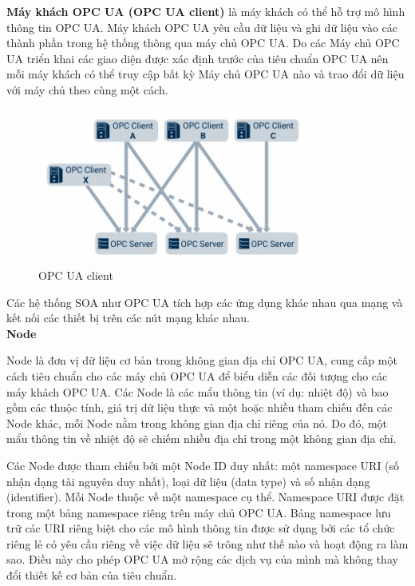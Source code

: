 \textbf{Máy khách OPC UA (OPC UA client)} là máy khách có thể hỗ trợ mô hình thông tin OPC UA. Máy khách OPC UA yêu cầu dữ liệu và ghi dữ liệu vào các thành phần trong hệ thống thông qua máy chủ OPC UA. Do các Máy chủ OPC UA triển khai các giao diện được xác định trước của tiêu chuẩn OPC UA nên mỗi máy khách có thể truy cập bất kỳ Máy chủ OPC UA nào và trao đổi dữ liệu với máy chủ theo cùng một cách.

\begin{figure}[!h]
    \centering
    \includegraphics[width=0.8\textwidth]{Images/Basis_knowledge/OPC_client.jpg}
    \caption{OPC UA client \cite{opcrw}}
    \label{fig:comp_mqtt}
\end{figure}

Các hệ thống SOA như OPC UA tích hợp các ứng dụng khác nhau qua mạng và kết nối các thiết bị trên các nút mạng khác nhau.\\

\newpage
\textbf{Node}

Node là đơn vị dữ liệu cơ bản trong không gian địa chỉ OPC UA, cung cấp một cách tiêu chuẩn cho các máy chủ OPC UA để biểu diễn các đối tượng cho các máy khách OPC UA. Các Node là các mẩu thông tin (ví dụ: nhiệt độ) và bao gồm các thuộc tính, giá trị dữ liệu thực và một hoặc nhiều tham chiếu đến các Node khác, mỗi Node nằm trong không gian địa chỉ riêng của nó. Do đó, một mẩu thông tin về nhiệt độ sẽ chiếm nhiều địa chỉ trong một không gian địa chỉ.

Các Node được tham chiếu bởi một Node ID duy nhất: một namespace URI (số nhận dạng tài nguyên duy nhất), loại dữ liệu (data type) và số nhận dạng (identifier). Mỗi Node thuộc về một namespace cụ thể. Namespace URI được đặt trong một bảng namespace riêng trên máy chủ OPC UA. Bảng namespace lưu trữ các URI riêng biệt cho các mô hình thông tin được sử dụng bởi các tổ chức riêng lẻ có yêu cầu riêng về việc dữ liệu sẽ trông như thế nào và hoạt động ra làm sao. Điều này cho phép OPC UA mở rộng các dịch vụ của mình mà không thay đổi thiết kế cơ bản của tiêu chuẩn.

